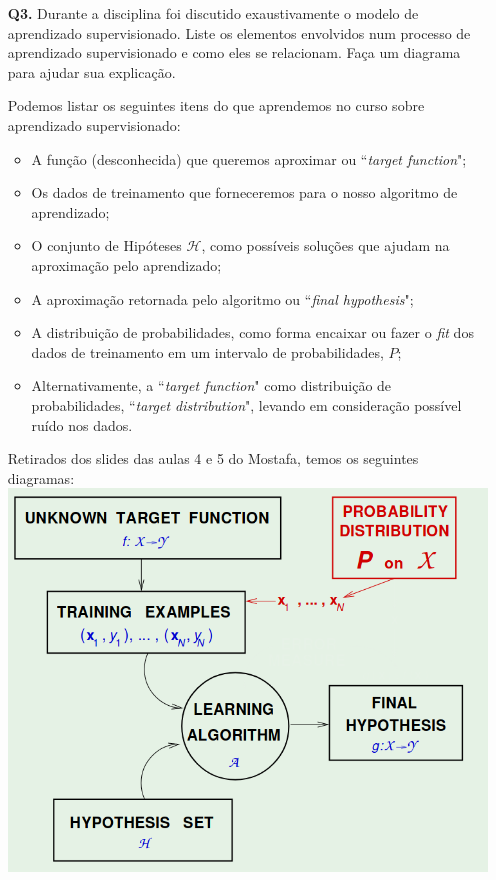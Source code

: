 \documentclass[12pt]{article}
\begin{document}
\begin{enumerate}
\item [\textbf{Q3.}] Durante a disciplina foi discutido exaustivamente o modelo de aprendizado supervisionado. Liste os elementos envolvidos num processo de aprendizado supervisionado e como eles se relacionam. Faça um diagrama para ajudar sua explicação. 
	\begin{addmargin}[1em]{2em}%
		Podemos listar os seguintes itens do que aprendemos no curso sobre aprendizado supervisionado:
			\begin{itemize}
				\item A função (desconhecida) que queremos aproximar ou ``\textit{target function}";
				\item Os dados de treinamento que forneceremos para o nosso algoritmo de aprendizado;
				\item O conjunto de Hipóteses $\mathcal{H}$, como possíveis soluções que ajudam na aproximação pelo aprendizado;
				\item A aproximação retornada pelo algoritmo ou ``\textit{final hypothesis}";
				\item A distribuição de probabilidades, como forma encaixar ou fazer o \textit{fit} dos dados de treinamento em um intervalo de probabilidades, $P$;
				\item Alternativamente, a ``\textit{target function}" como distribuição de probabilidades, ``\textit{target distribution}", levando em consideração possível ruído nos dados.
			\end{itemize}
			Retirados dos slides das aulas 4 e 5 do Mostafa, temos os seguintes diagramas:
		\includegraphics[scale=.3]{"images/SupervisedLearning-a"}

\end{addmargin}
\end{enumerate}
\end{document}
